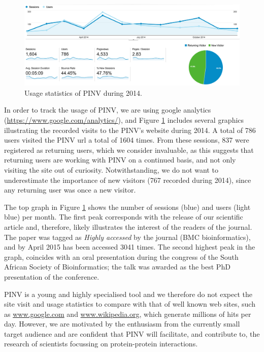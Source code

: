 \begin{figure}
\centering
\includegraphics[width=\textwidth]{figures/google_analytics.png}
\caption[Usage statistics of PINV during 2014]{Usage statistics of PINV during 2014. 
\label{fig:google_analytics}}
\end{figure}

In order to track the usage of PINV, we are using google analytics (\url{https://www.google.com/analytics/}), and Figure \ref{fig:google_analytics} includes several graphics illustrating the recorded visits to the PINV's website during 2014. A total of 786 users visited the PINV url a total of 1604 times. From these sessions, 837 were registered as returning users, which we consider invaluable, as this suggests that returning users are working with PINV on a continued basis, and not only visiting the site out of curiosity.  Notwithstanding, we do not want to underestimate the importance of new visitors (767 recorded during 2014), since any returning user was once a new visitor.

The top graph in Figure \ref{fig:google_analytics} shows the number of sessions (blue) and users (light blue) per month. The first peak corresponds with the release of our scientific article \cite{SAL2014} and, therefore, likely illustrates the interest of the readers of the journal. The paper was tagged as \emph{Highly accessed} by the journal (BMC bioinformatics), and by April 2015 has been accessed 3041 times. The second highest peak in the graph, coincides with an oral presentation during the congress of the South African Society of Bioinformatics; the talk was awarded as the best PhD presentation of the conference.

PINV is a young and highly specialised tool and we therefore do not expect the site visit and usage statistics to compare with that of  well known web sites, such as \url{www.google.com} and \url{www.wikipedia.org}, which generate millions of hits per day. However, we are motivated by the enthusiasm from the currently small target audience and are confident that PINV will facilitate, and contribute to, the research of scientists focussing on protein-protein interactions.

